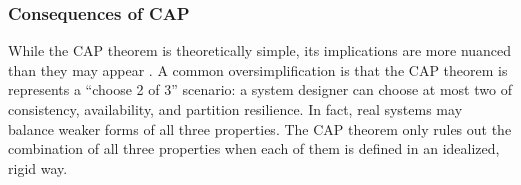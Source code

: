 \documentclass[]             %
{NASA}                       %
\theoremstyle{definition}
\begin{document}

\subsubsection{Consequences of CAP}
\label{interpretation-of-the-cap-theorem}
While the CAP theorem is theoretically simple, its implications are
more nuanced than they may appear \cite{2012CAP12Years}. A common
oversimplification is that the CAP theorem is represents a ``choose 2
of 3'' scenario: a system designer can choose at most two of
consistency, availability, and partition resilience. In fact, real
systems may balance weaker forms of all three properties. The CAP
theorem only rules out the combination of all three properties when
each of them is defined in an idealized, rigid way.
\end{document}
